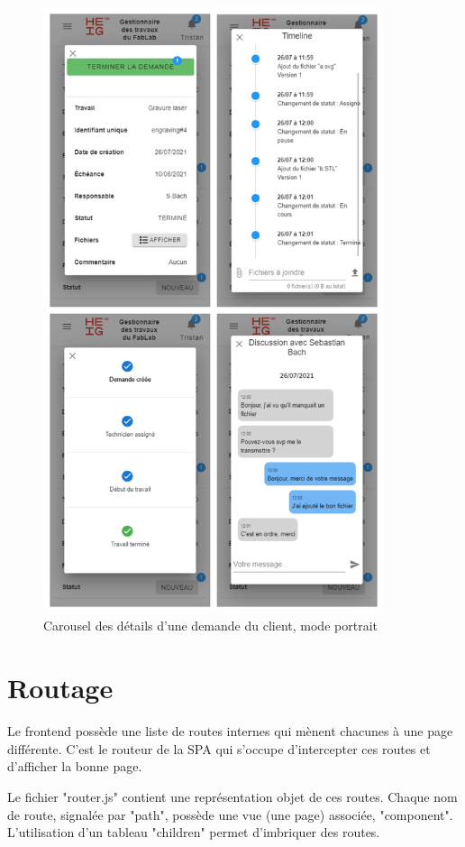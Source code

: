 \documentclass[
    iai, %
    eai, %
]{heig-tb}
\begin{document}
\begin{figure}[h]
  \centering
  \includegraphics[width=10cm]{ui_mobile_jobinfo.png}
  \caption{Carousel des détails d'une demande du client, mode portrait}
\end{figure}

\newpage
\section{Routage}
Le frontend possède une liste de routes internes qui mènent chacunes à une page différente. C'est le routeur de la SPA qui s'occupe d'intercepter ces routes et d'afficher la bonne page.

Le fichier "router.js" contient une représentation objet de ces routes. Chaque nom de route, signalée par "path", possède une vue (une page) associée, "component". L'utilisation d'un tableau "children" permet d'imbriquer des routes.
\end{document}
